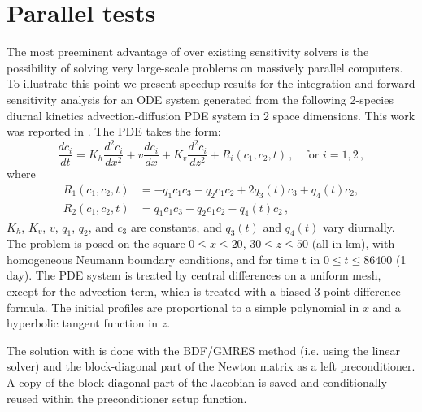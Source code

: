 \section{Parallel tests}\label{s:ex_tests}


The most preeminent advantage of {\cvodes} over existing sensitivity solvers is
the possibility of solving very large-scale problems on massively parallel 
computers. To illustrate this point we present speedup results for the 
integration and forward sensitivity analysis for
an ODE system generated from the following 2-species diurnal
kinetics advection-diffusion PDE system in 2 space dimensions.
This work was reported in \cite{SeHi:03}.
The PDE takes the form:
\begin{equation*}
  \frac{dc_i}{dt} = K_h \frac{d^2c_i}{dx^2} + v \frac{dc_i}{dx} 
  + K_v \frac{d^2c_i}{dz^2}
  + R_i(c_1, c_2, t) \, , \quad \text{for } i=1,2 \, ,
\end{equation*}
where
\begin{equation*}
  \begin{split}
    R_1(c_1,c_2,t) &= -q_1 c_1 c_3 - q_2 c_1 c_2 + 2 q_3(t) c_3 + q_4(t) c_2 , \\
    R_2(c_1,c_2,t) &=  q_1 c_1 c_3 - q_2 c_1 c_2 - q_4(t) c_2 \, ,
  \end{split}
\end{equation*}
$K_h$, $K_v$, $v$, $q_1$, $q_2$, and $c_3$ are constants, and $q_3(t)$ and $q_4(t)$
vary diurnally.   
The problem is posed on the square
$0 \le x \le 20$, $30 \le z \le 50$   (all in km),
with homogeneous Neumann boundary conditions, and for time t in
$0 \le t \le 86400$ (1 day).
The PDE system is treated by central differences on a uniform
mesh, except for the advection term, which is treated with a biased
3-point difference formula.
The initial profiles are proportional to a simple polynomial in $x$
and a hyperbolic tangent function in $z$.

The solution with {\cvodes} is done with the BDF/GMRES method (i.e.
using the {\cvspgmr} linear solver) and the block-diagonal part of the 
Newton matrix as a left preconditioner. A copy of the block-diagonal
part of the Jacobian is saved and conditionally reused within the
preconditioner setup function.

